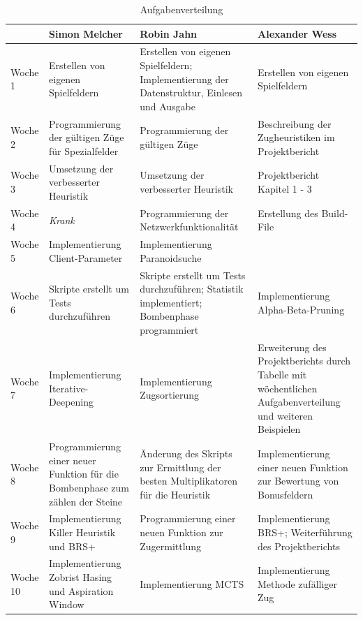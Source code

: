 \documentclass[12pt,a4paper,bibliography=totocnumbered,listof=totocnumbered]{article}
\begin{document}
\newpage
\vspace{1em}
\begin{table}[!h]
\centering
	\begin{tabular} {| m{1.7cm} | m{3.5cm} | m{3.5cm} | m{3.5cm}|}
		\hline
		\textbf{} &\textbf{Simon Melcher} & \textbf{Robin Jahn} & \textbf{Alexander Wess}\\
		\hline
		Woche 1 & Erstellen von eigenen Spielfeldern & Erstellen von eigenen Spielfeldern; Implementierung der Datenstruktur, Einlesen und Ausgabe & Erstellen von eigenen Spielfeldern\\
		\hline
		Woche 2 & Programmierung der gültigen Züge für Spezialfelder & Programmierung der gültigen Züge & Beschreibung der Zugheuristiken im Projektbericht\\
		\hline
		Woche 3 & Umsetzung der verbesserter Heuristik & Umsetzung der verbesserter Heuristik & Projektbericht Kapitel 1 - 3\\
		\hline
		Woche 4 & \textit{Krank} & Programmierung der Netzwerkfunktionalität & Erstellung des Build-File\\
		\hline
		Woche 5 & Implementierung Client-Parameter & Implementierung Paranoidsuche &\\
		\hline
		Woche 6 & Skripte erstellt um Tests durchzuführen & Skripte erstellt um Tests durchzuführen; Statistik implementiert; Bombenphase programmiert & Implementierung Alpha-Beta-Pruning\\
		\hline
		Woche 7 & Implementierung Iterative-Deepening & Implementierung Zugsortierung & Erweiterung des Projektberichts durch Tabelle mit wöchentlichen Aufgabenverteilung und weiteren Beispielen\\
		\hline
		Woche 8 & Programmierung einer neuer Funktion für die Bombenphase zum zählen der Steine & Änderung des Skripts zur Ermittlung der besten Multiplikatoren für die Heuristik & Implementierung einer neuen Funktion zur Bewertung von Bonusfeldern\\
		\hline
		Woche 9 & Implementierung Killer Heuristik und BRS+ & Programmierung einer neuen Funktion zur Zugermittlung & Implementierung BRS+; Weiterführung des Projektberichts\\
		\hline
		Woche 10 & Implementierung Zobrist Hasing und Aspiration Window & Implementierung MCTS & Implementierung Methode zufälliger Zug\\
		\hline
	\end{tabular}
	\caption{Aufgabenverteilung}
	\label{tab:tasks}
\end{table}
\newpage
\end{document}
